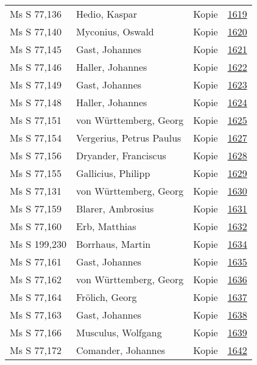 \documentclass[10pt,a4paper,landscape]{report}
\begin{document}
\begin{longtable}{p{16cm}p{4cm}lr}
Ms S 77,136	&	Hedio, Kaspar	&	Kopie	&	\href{http://130.60.24.72/assignment/1619}{1619}\\
Ms S 77,140	&	Myconius, Oswald	&	Kopie	&	\href{http://130.60.24.72/assignment/1620}{1620}\\
Ms S 77,145	&	Gast, Johannes	&	Kopie	&	\href{http://130.60.24.72/assignment/1621}{1621}\\
Ms S 77,146	&	Haller, Johannes	&	Kopie	&	\href{http://130.60.24.72/assignment/1622}{1622}\\
Ms S 77,149	&	Gast, Johannes	&	Kopie	&	\href{http://130.60.24.72/assignment/1623}{1623}\\
Ms S 77,148	&	Haller, Johannes	&	Kopie	&	\href{http://130.60.24.72/assignment/1624}{1624}\\
Ms S 77,151	&	von Württemberg, Georg	&	Kopie	&	\href{http://130.60.24.72/assignment/1625}{1625}\\
Ms S 77,154	&	Vergerius, Petrus Paulus	&	Kopie	&	\href{http://130.60.24.72/assignment/1627}{1627}\\
Ms S 77,156	&	Dryander, Franciscus	&	Kopie	&	\href{http://130.60.24.72/assignment/1628}{1628}\\
Ms S 77,155	&	Gallicius, Philipp	&	Kopie	&	\href{http://130.60.24.72/assignment/1629}{1629}\\
Ms S 77,131	&	von Württemberg, Georg	&	Kopie	&	\href{http://130.60.24.72/assignment/1630}{1630}\\
Ms S 77,159	&	Blarer, Ambrosius	&	Kopie	&	\href{http://130.60.24.72/assignment/1631}{1631}\\
Ms S 77,160	&	Erb, Matthias	&	Kopie	&	\href{http://130.60.24.72/assignment/1632}{1632}\\
Ms S 199,230	&	Borrhaus, Martin	&	Kopie	&	\href{http://130.60.24.72/assignment/1634}{1634}\\
Ms S 77,161	&	Gast, Johannes	&	Kopie	&	\href{http://130.60.24.72/assignment/1635}{1635}\\
Ms S 77,162	&	von Württemberg, Georg	&	Kopie	&	\href{http://130.60.24.72/assignment/1636}{1636}\\
Ms S 77,164	&	Frölich, Georg	&	Kopie	&	\href{http://130.60.24.72/assignment/1637}{1637}\\
Ms S 77,163	&	Gast, Johannes	&	Kopie	&	\href{http://130.60.24.72/assignment/1638}{1638}\\
Ms S 77,166	&	Musculus, Wolfgang	&	Kopie	&	\href{http://130.60.24.72/assignment/1639}{1639}\\
Ms S 77,172	&	Comander, Johannes	&	Kopie	&	\href{http://130.60.24.72/assignment/1642}{1642}\\

\end{longtable}
\end{document}
